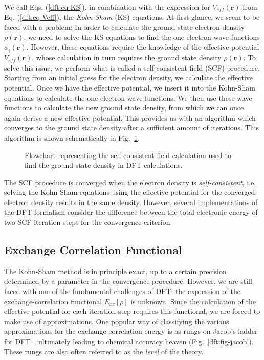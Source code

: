 \begin{refsection}
We call Eqs. (\ref{dft:eq-KS}), in combination with the expression for 
$V_{eff}(\mathbf{r})$ from Eq. (\ref{dft:eq-Veff}), the \textit{Kohn-Sham} (\gls{KS}) 
equations. At first glance, we seem to be faced with a problem: In order to 
calculate the ground state electron density $\rho(\mathbf{r})$, we need to 
solve the \gls{KS} equations to find the one electron wave functions 
$\phi_i(\mathbf{r})$. However, these equations require the knowledge of the 
effective potential $V_{eff}(\mathbf{r})$, whose calculation in turn requires 
the ground state density $\rho(\mathbf{r})$. To solve this issue, we perform 
what is called a self-consistent field (\gls{SCF}) procedure. Starting from 
an initial guess for the electron density, we calculate the effective 
potential. Once we have the effective potential, we insert it into the 
Kohn-Sham equations to calculate the one electron wave functions. We then use 
these wave functions to calculate the new ground state density, from which we 
can once again derive a new effective potential. This provides us with an 
algorithm which converges to the ground state density after a sufficient 
amount of iterations. This algorithm is shown schematically in Fig.~\ref{dft:fig-scf_cycle}.  

\begin{figure}[ht]  
\centering 

\caption{\label{dft:fig-scf_cycle} Flowchart representing the self consistent field 
calculation used to find the ground state density in \gls{DFT} calculations.} 
\end{figure} 
 
The \gls{SCF} procedure is converged when the electron density is 
\textit{self-consistent}, i.e. solving the Kohn Sham equations using the 
effective potential for the converged electron density results in the same 
density. However, several implementations of the \gls{DFT} formalism consider the 
difference between the total electronic energy of two \gls{SCF} iteration steps for 
the convergence criterion. 
 
\subsection{Exchange Correlation Functional} \label{dft:sec-functionals} 
 
The Kohn-Sham method is in principle exact, up to a certain precision 
determined by a parameter in the convergence procedure. However, we are still 
faced with one of the fundamental challenges of \gls{DFT}: the expression of the 
exchange-correlation functional $E_{xc}[\rho]$ is unknown. Since the calculation of the effective potential for each iteration step requires this functional, we 
are forced to make use of approximations. One popular way of classifying the 
various approximations for the exchange-correlation energy is as rungs on 
Jacob's ladder for \gls{DFT}~\cite{Perdew2001}, ultimately leading to chemical 
accuracy heaven (Fig.~\ref{dft:fig-jacob}). These rungs are also often referred to 
as the \textit{level} of the theory. 
 

\end{refsection}
